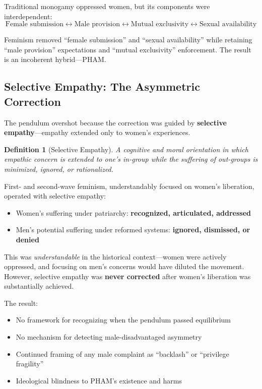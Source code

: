 \documentclass[12pt,openany]{book}
\newtheorem{definition}{Definition}[chapter]
\numberwithin{equation}{chapter}
\begin{document}
Traditional monogamy oppressed women, but its components were interdependent:
\[
\text{Female submission} \leftrightarrow \text{Male provision} \leftrightarrow \text{Mutual exclusivity} \leftrightarrow \text{Sexual availability}
\]

Feminism removed ``female submission'' and ``sexual availability'' while retaining ``male provision'' expectations and ``mutual exclusivity'' enforcement. The result is an incoherent hybrid---PHAM.

\subsection{Selective Empathy: The Asymmetric Correction}

The pendulum overshot because the correction was guided by \textbf{selective empathy}---empathy extended only to women's experiences.

\begin{definition}[Selective Empathy]
A cognitive and moral orientation in which empathic concern is extended to one's in-group while the suffering of out-groups is minimized, ignored, or rationalized.
\end{definition}

First- and second-wave feminism, understandably focused on women's liberation, operated with selective empathy:
\begin{itemize}
    \item Women's suffering under patriarchy: \textbf{recognized, articulated, addressed}
    \item Men's potential suffering under reformed systems: \textbf{ignored, dismissed, or denied}
\end{itemize}

This was \textit{understandable} in the historical context---women were actively oppressed, and focusing on men's concerns would have diluted the movement. However, selective empathy was \textbf{never corrected} after women's liberation was substantially achieved.

The result:
\begin{itemize}
    \item No framework for recognizing when the pendulum passed equilibrium
    \item No mechanism for detecting male-disadvantaged asymmetry
    \item Continued framing of any male complaint as ``backlash'' or ``privilege fragility''
    \item Ideological blindness to PHAM's existence and harms
\end{itemize}
\end{document}
